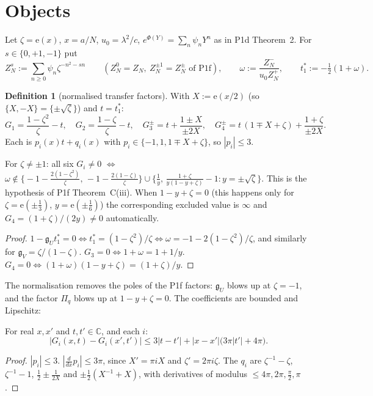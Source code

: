 \documentclass[11pt]{article}
\theoremstyle{definition}\newtheorem{definition}[theorem]{Definition}
\theoremstyle{remark}\newtheorem{remark}[theorem]{Remark}
\newcommand{\e}{\mathrm{e}}
\begin{document}
\section{Objects}\label{sec:obj}
Let $\zeta=\e(x)$, $x=a/N$, $u_0=\lambda^2/c$, $e^{\Phi(Y)}=\sum_n\psi_nY^n$ as in P1d Theorem~2. For $s\in\{0,+1,-1\}$ put
\[Z^s_N:=\sum_{n\ge0}\psi_n\zeta^{-n^2-sn}\qquad(Z^0_N=Z_N,\ Z^{\pm1}_N=Z^\pm_N\text{ of P1f}),\qquad \omega:=\frac{Z^-_N}{u_0Z^+_N},\qquad t_1^*:=-\tfrac12(1+\omega).\]
\begin{definition}[normalised transfer factors]\label{def:G}
With $X:=\e(x/2)$ (so $\{X,-X\}=\{\pm\sqrt\zeta\}$) and $t=t_1^*$:
\[G_1=\frac{1-\zeta^2}\zeta-t,\quad G_2=\frac{1-\zeta}\zeta-t,\quad G_3^{\pm}=t+\frac{1\pm X}{\pm2X},\quad G_4^{\pm}=t\,(1\mp X+\zeta)+\frac{1+\zeta}{\pm2X}.\]
Each is $p_i(x)t+q_i(x)$ with $p_i\in\{-1,1,1\mp X+\zeta\}$, so $|p_i|\le3$.
\end{definition}
\begin{lemma}[PROVED]\label{lem:Geq}
For $\zeta\ne\pm1$: all six $G_i\ne0$ $\iff$ $\omega\notin\big\{-1-\frac{2(1-\zeta^2)}\zeta,\,-1-\frac{2(1-\zeta)}\zeta\big\}\cup\big\{\frac1y,\,\frac{1+\zeta}{y(1-y+\zeta)}-1:y=\pm\sqrt\zeta\big\}$. This is the hypothesis of P1f Theorem~C(iii). When $1-y+\zeta=0$ (this happens only for $\zeta=\e(\pm\frac13)$, $y=\e(\pm\frac16)$) the corresponding excluded value is $\infty$ and $G_4=(1+\zeta)/(2y)\ne0$ automatically.
\end{lemma}
\begin{proof}
$1-\mathfrak g_Ut_1^*=0\iff t_1^*=(1-\zeta^2)/\zeta\iff\omega=-1-2(1-\zeta^2)/\zeta$, and similarly for $\mathfrak g_V=\zeta/(1-\zeta)$. $G_3=0\iff1+\omega=1+1/y$. $G_4=0\iff(1+\omega)(1-y+\zeta)=(1+\zeta)/y$.
\end{proof}
The normalisation removes the poles of the P1f factors: $\mathfrak g_U$ blows up at $\zeta=-1$, and the factor $\Pi_q$ blows up at $1-y+\zeta=0$. The coefficients are bounded and Lipschitz:
\begin{lemma}\label{lem:Lip}
For real $x,x'$ and $t,t'\in\mathbb C$, and each $i$:
\[|G_i(x,t)-G_i(x',t')|\le3|t-t'|+|x-x'|\big(3\pi|t'|+4\pi\big).\]
\end{lemma}
\begin{proof}
$|p_i|\le3$. $|\frac{d}{dx}p_i|\le3\pi$, since $X'=\pi iX$ and $\zeta'=2\pi i\zeta$. The $q_i$ are $\zeta^{-1}-\zeta$, $\zeta^{-1}-1$, $\frac12\pm\frac1{2X}$ and $\pm\frac12(X^{-1}+X)$, with derivatives of modulus $\le4\pi,2\pi,\frac\pi2,\pi$.
\end{proof}
\end{document}
